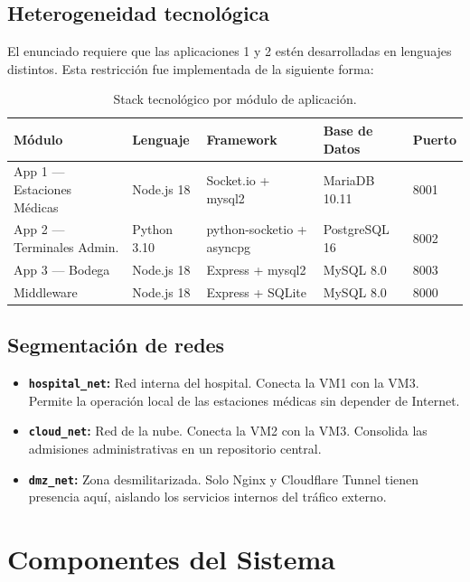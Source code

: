 \documentclass[11pt,a4paper]{article}
\begin{document}
\subsection{Heterogeneidad tecnológica}

El enunciado requiere que las aplicaciones 1 y 2 estén desarrolladas en lenguajes distintos.
Esta restricción fue implementada de la siguiente forma:

\begin{table}[h!]
\centering
\begin{tabular}{lllll}
\toprule
\textbf{Módulo} & \textbf{Lenguaje} & \textbf{Framework} & \textbf{Base de Datos} & \textbf{Puerto} \\
\midrule
App 1 — Estaciones Médicas   & Node.js 18 & Socket.io + mysql2   & MariaDB 10.11   & 8001 \\
App 2 — Terminales Admin.    & Python 3.10 & python-socketio + asyncpg & PostgreSQL 16 & 8002 \\
App 3 — Bodega               & Node.js 18 & Express + mysql2    & MySQL 8.0       & 8003 \\
Middleware                   & Node.js 18 & Express + SQLite    & MySQL 8.0       & 8000 \\
\bottomrule
\end{tabular}
\caption{Stack tecnológico por módulo de aplicación.}
\end{table}

\subsection{Segmentación de redes}

\begin{itemize}
    \item \textbf{\texttt{hospital\_net}:} Red interna del hospital. Conecta la VM1 con la VM3.
          Permite la operación local de las estaciones médicas sin depender de Internet.
    \item \textbf{\texttt{cloud\_net}:} Red de la nube. Conecta la VM2 con la VM3.
          Consolida las admisiones administrativas en un repositorio central.
    \item \textbf{\texttt{dmz\_net}:} Zona desmilitarizada. Solo Nginx y Cloudflare Tunnel
          tienen presencia aquí, aislando los servicios internos del tráfico externo.
\end{itemize}

\section{Componentes del Sistema}
\end{document}
